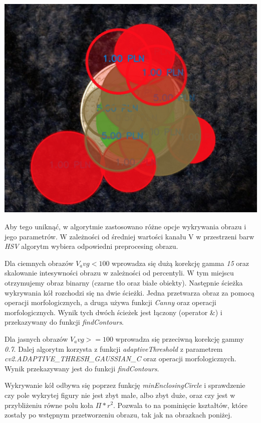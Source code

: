 \documentclass{mwart}
\begin{document}
\begin{center}
    \includegraphics[width=\textwidth]{Objects.png}
\end{center}

Aby tego uniknąć, w algorytmie zastosowano różne opcje wykrywania obrazu i jego parametrów. W zależności od średniej wartości kanału V w przestrzeni barw \textit{HSV} algorytm wybiera odpowiedni preprocesing obrazu.

Dla ciemnych obrazów $V_avg < 100$ wprowadza się dużą korekcję gamma \textit{15} oraz skalowanie intesywności obrazu w zależności od percentyli.
W tym miejscu otrzymujemy obraz binarny (czarne tło oraz białe obiekty).
Następnie ścieżka wykrywania kół rozchodzi się na dwie ścieżki. Jedna przetwarza obraz za pomocą operacji morfologicznych, a druga używa funkcji \textit{Canny} oraz operacji morfologicznych. Wynik tych dwóch ścieżek jest łączony (operator \&) i przekazywany do funkcji \textit{findContours}.

Dla jasnych obrazów $V_avg >= 100$ wprowadza się przeciwną korekcję gammy \textit{0.7}. Dalej algorytm korzysta z funkcji \textit{adaptiveThreshold} z parametrem \textit{cv2.ADAPTIVE\_THRESH\_GAUSSIAN\_C} oraz operacji morfologicznych. Wynik przekazywany jest do funkcji \textit{findContours}.

Wykrywanie kół odbywa się poprzez funkcję \textit{minEnclosingCircle} i sprawdzenie czy pole wykrytej figury nie jest zbyt małe, albo zbyt duże, oraz czy jest w przybliżeniu równe polu koła $\Pi * r^2$. Pozwala to na pominięcie kształtów, które zostały po wstępnym przetworzeniu obrazu, tak jak na obrazkach poniżej.
\end{document}
